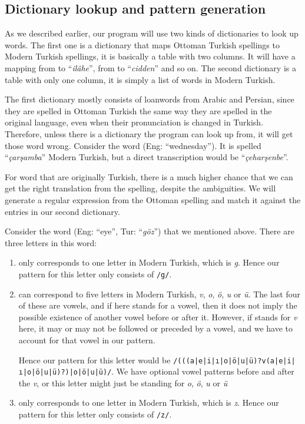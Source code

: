 \documentclass[10pt,twocolumn]{article}
\theoremstyle{nonumberplain}
\newcommand{\otto}[1]{\RLE{\ottoman{}\Large{}#1}}
\newcommand{\word}[1]{``\emph{#1}''}
\begin{document}
\subsection{Dictionary lookup and pattern generation}

As we described earlier, our program will use two kinds of dictionaries to look
up words. The first one is a dictionary that maps Ottoman Turkish spellings to
Modern Turkish spellings, it is basically a table with two columns.
It will have a mapping from \otto{الهه} to \word{ilâhe}, from \otto{جدا} to
\word{cidden} and so on. The second dictionary is a table with only one column,
it is simply a list of words in Modern Turkish.

The first dictionary mostly consists of loanwords from Arabic and Persian, since
they are spelled in Ottoman Turkish the same way they are spelled in the
original language, even when their pronunciation is changed in Turkish.
Therefore, unless there is a dictionary the program can look up from, it will
get those word wrong.
Consider the word \otto{چهارشنبه} (Eng: ``wednesday''). It is spelled
\word{çarşamba} Modern Turkish, but a direct transcription would be
\word{çeharşenbe}.

For word that are originally Turkish, there is a much higher chance that we can
get the right translation from the spelling, despite the ambiguities.
We will generate a regular expression from the Ottoman spelling and match it
against the entries in our second dictionary.

Consider the word \otto{گوز} (Eng: ``eye'', Tur: \word{göz}) that we mentioned above.
There are three letters in this word: %
\begin{enumerate}[noitemsep,topsep=0pt]
  \item \otto{گ} only corresponds to one letter in Modern Turkish, which is
    \emph{g}. Hence our pattern for this letter only consists of \texttt{/g/}.
  \item \otto{و} can correspond to five letters in Modern Turkish, \emph{v},
    \emph{o}, \emph{ö}, \emph{u} or \emph{ü}. The last four of these are
    vowels, and if \otto{و} here stands for a vowel, then it does not imply the
    possible existence of another vowel before or after it. However, if
    \otto{و} stands for \emph{v} here, it may or may not be followed or
    preceded by a vowel, and we have to account for that vowel in our pattern.

    Hence our pattern for this letter would be
    \texttt{/(((a|e|i|ı|o|ö|u|ü)?v(a|e|i|ı|o|ö|u|ü)?)|o|ö|u|ü)/}.
    We have optional vowel patterns before and after the \emph{v}, or this
    letter might just be standing for \emph{o}, \emph{ö}, \emph{u} or \emph{ü}
\item \otto{ز} only corresponds to one letter in Modern Turkish, which is
    \emph{z}. Hence our pattern for this letter only consists of \texttt{/z/}.
\end{enumerate}
\end{document}
